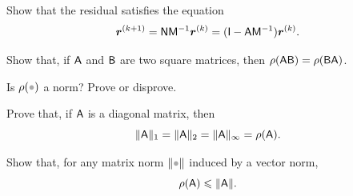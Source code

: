 \begin{exercise}
    Show that the residual satisfies the equation
    \[
        \mathbf{\boldsymbol{r}}^{(k+1)} = \mathsf N \mathsf M^{-1} \mathbf{\boldsymbol{r}}^{(k)} = (\mathsf I - \mathsf A \mathsf M^{-1}) \mathbf{\boldsymbol{r}}^{(k)}.
    \]
\end{exercise}

\begin{exercise}
    Show that, if $\mathsf A$ and $\mathsf B$ are two square matrices,
    then $\rho(\mathsf A \mathsf B) = \rho(\mathsf B \mathsf A)$.
\end{exercise}

\begin{exercise}
    Is $\rho(\placeholder)$ a norm? Prove or disprove.
\end{exercise}

\begin{exercise}
    Prove that, if $\mathsf A$ is a diagonal matrix, then
    \[
        \lVert\mathsf A\rVert_1 = \lVert\mathsf A\rVert_2 = \lVert\mathsf A\rVert_{\infty} = \rho(\mathsf A).
    \]
\end{exercise}

\begin{exercise}
    Show that, for any matrix norm $\norm{\placeholder}$ induced by a vector norm,
    \[
        \rho(\mathsf A) \leqslant \lVert\mathsf A\rVert.
    \]
\end{exercise}

